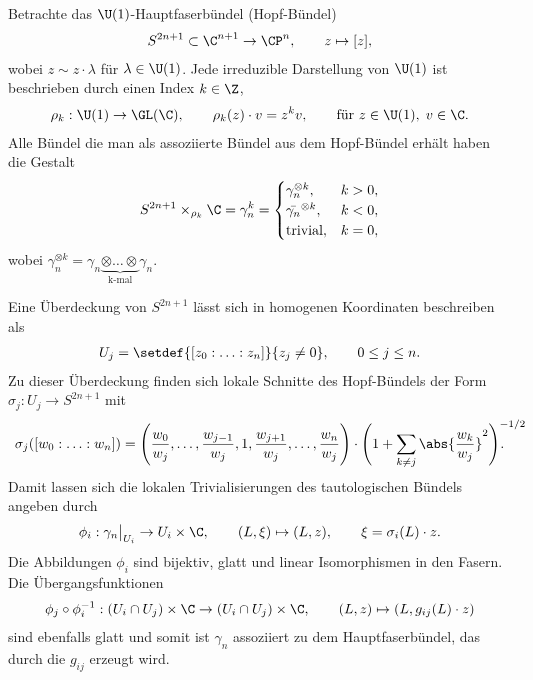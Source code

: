 \documentclass[%
	paper=a5,%
	fleqn,%
	DIV=18,%
	BCOR=0mm,
	fontsize=11pt,
	titlepage=false,%
	bibliography=totoc,
	DIV=18,%
	twoside=true,
	pdftitle=Riemannsche Geometrie,
	pdfauthor=Uwe Semmelmann,
	numbers=noendperiod]%
	{scrbook}
\begin{document}
\begin{ex}
\begin{exenum}
Betrachte das $\U(1)$-Hauptfaserbündel (Hopf-Bündel)
\begin{align*}
S^{2n+1}\subset \C^{n+1} \to \CP^n,\qquad z\mapsto [z],
\end{align*}
wobei $z \sim z\cdot \lambda$ für $\lambda\in \U(1)$. Jede irreduzible
Darstellung von $\U(1)$ ist beschrieben durch einen Index $k\in\Z$,
\begin{align*}
\rho_k : \U(1)\to \GL(\C),\qquad \rho_k(z)\cdot v = z^kv,\qquad
\text{für }z\in\U(1),\; v\in \C.
\end{align*}
Alle Bündel die man als assoziierte Bündel aus dem Hopf-Bündel erhält haben die
Gestalt
\begin{align*}
S^{2n+1}\times_{\rho_k}\C = \gamma_n^k =
\begin{cases}
\gamma_n^{\otimes k}, & k > 0,\\
\bar{\gamma_n}^{\otimes k}, & k < 0,\\
\text{trivial}, & k=0,
\end{cases}
\end{align*}
wobei $\gamma_n^{\otimes k} = \gamma_n \underbrace{\otimes \ldots
\otimes}_{\text{k-mal}} \gamma_n$.

Eine Überdeckung von $S^{2n+1}$ lässt sich in homogenen Koordinaten beschreiben
als
\begin{align*}
U_j = \setdef{[z_0:\ldots:z_n]}{z_j\neq 0},\qquad 0\le j \le n.
\end{align*}
Zu dieser Überdeckung finden sich lokale Schnitte des Hopf-Bündels der
Form $\sigma_j : U_j \to S^{2n+1}$ mit
\begin{align*}
\sigma_j([w_0:\ldots:w_n]) =
\Biggl(\frac{w_0}{w_j},\ldots,
\frac{w_{j-1}}{w_j},1,\frac{w_{j+1}}{w_j},\ldots,\frac{w_n}{w_j}
\Biggr)\cdot\Biggl(1 + \sum_{k\neq j}
\abs{\frac{w_k}{w_j}}^2\Biggr)^{-1/2}\!\!\!\!\!\!\!\!\!\!\!.
\end{align*}
Damit lassen sich die lokalen Trivialisierungen des tautologischen Bündels
angeben durch
\begin{align*}
\phi_i: \gamma_n\big|_{U_i} \to U_i\times \C,\qquad (L,\xi) \mapsto (L,z),\qquad
\xi = \sigma_i(L)\cdot z.
\end{align*}
Die Abbildungen $\phi_i$ sind bijektiv, glatt und linear Isomorphismen in den
Fasern. Die Übergangsfunktionen
\begin{align*}
\phi_j\circ\phi_i^{-1}: (U_i\cap U_j)\times\C\to (U_i\cap U_j)\times\C,\qquad
(L,z) \mapsto (L,g_{ij}(L)\cdot z)
\end{align*}
sind ebenfalls glatt und somit ist $\gamma_n$ assoziiert zu dem
Hauptfaserbündel, das durch die $g_{ij}$ erzeugt wird.\bsp
\end{exenum}

\end{ex}
\end{document}
